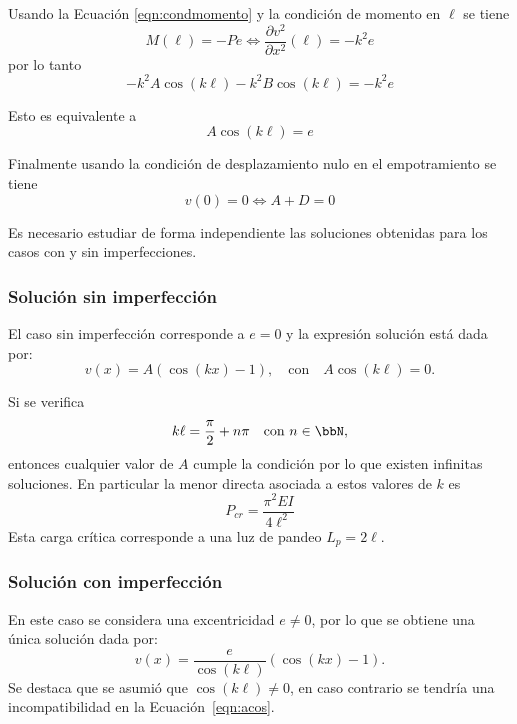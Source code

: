 Usando la Ecuación \eqref{eqn:condmomento} y la condición de momento en $\ell$ se tiene
%
\begin{equation}
M(\ell) = -P e \Leftrightarrow \frac{\partial v^2}{\partial x^2} (\ell)  = - k^2 e
\end{equation}
%
por lo tanto
%
\begin{equation}
-k^2 A \cos(k\ell) - k^2 B \cos(k\ell) = -k^2 e
\end{equation}

Esto es equivalente a 
\begin{equation}\label{eqn:acos}
\boxed{
A \cos(k\ell)  = e
}
\end{equation}

Finalmente usando la condición de desplazamiento nulo en el empotramiento se tiene
%
\begin{equation}
v(0)=0  \Leftrightarrow \boxed{ A + D = 0}
\end{equation}

Es necesario estudiar de forma independiente las soluciones obtenidas para los casos con y sin imperfecciones.

\subsubsection{Solución sin imperfección}

El caso sin imperfección corresponde a $e=0$ y la expresión solución está dada por:
%
\begin{equation}
v(x) = A (\cos(k x) -1), \quad \text{con} \quad A\cos(k\ell) = 0.
\end{equation}

Si se verifica
%
\begin{equation}
k \ell = \frac{\pi}{2} + n\pi  \quad \text{con} \,\, n\in \bbN,
\end{equation}
%
entonces cualquier valor de $A$ cumple la condición por lo que existen infinitas soluciones. %
%
En particular la menor directa asociada a estos valores de $k$ es
\begin{equation}
\boxed{
P_{cr} = \frac{\pi^2 E I}{4 \ell^2}}
\end{equation}
%
Esta carga crítica corresponde a una luz de pandeo $L_p = 2\ell$.

\subsubsection{Solución con imperfección}

En este caso se considera una excentricidad $e \neq 0$, por lo que se obtiene una única solución dada por:
%
\begin{equation}
v(x) = \frac{e}{\cos(k\ell)} (\cos(k x) -1).
\end{equation}
%
Se destaca que se asumió que $\cos(k \ell) \neq 0$, en caso contrario se tendría una incompatibilidad en la Ecuación~\eqref{eqn:acos}. %

